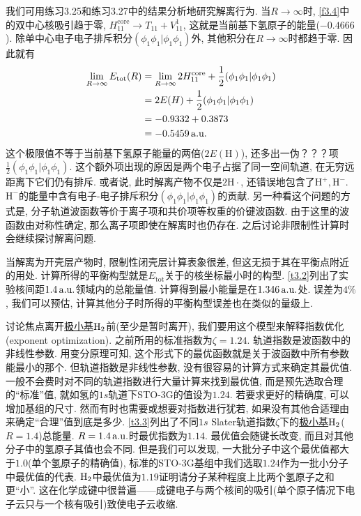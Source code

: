 我们可用练习3.25和练习3.27中的结果分析地研究解离行为. 当$R\to\infty$时, \ref{f3.4}中的双中心核吸引趋于零, $H_{11}^\mathrm{core}\to T_{11}+V_{11}^1$, 这就是当前基下氢原子的能量($-0.4666$). 除单中心电子电子排斥积分$(\phi_1\phi_1|\phi_1\phi_1)$外, 其他积分在$R\to \infty$时都趋于零. 因此就有
\begin{align*}
\lim_{R\to\infty} E_\mathrm{tot}(R) & = \lim_{R\to\infty} 2H_{11}^\mathrm{core} + \frac{1}{2}(\phi_1\phi_1|\phi_1\phi_1)\\
& = 2E(H) + \frac{1}{2}(\phi_1\phi_1|\phi_1\phi_1)\\
& = -0.9332 + 0.3873\\
& = -0.5459\,\mathrm{a.u.}
\end{align*}
这个极限值不等于当前基下氢原子能量的两倍($2E(\mathrm{H})$), 还多出一伪？？？项$\frac{1}{2}(\phi_1\phi_1|\phi_1\phi_1)$. 这个额外项出现的原因是两个电子占据了同一空间轨道, 在无穷远距离下它们仍有排斥. 或者说, 此时解离产物不仅是$2\mathrm{H}\cdot$, 还错误地包含了$\mathrm{H}^+,\mathrm{H}^-$. $\mathrm{H}^-$的能量中含有电子-电子排斥积分$(\phi_1\phi_1|\phi_1\phi_1)$的贡献. 另一种看这个问题的方式是, 分子轨道波函数等价于离子项和共价项等权重的价键波函数. 由于这里的波函数由对称性确定, 那么离子项即使在解离时也仍存在. 之后讨论非限制性\hft 计算时会继续探讨解离问题.

当解离为开壳层产物时, 限制性闭壳层\hft 计算表象很差, 但这无损于其在平衡点附近的用处. 计算所得的平衡构型就是$E_\mathrm{tot}$关于的核坐标最小时的构型. \ref{t3.2}列出了实验核间距$1.4\,\mathrm{a.u.}$领域内的总能量值. 计算得到最小能量是在$1.346\,\mathrm{a.u.}$处. 误差为$4\%$, 我们可以预估, 计算其他分子时所得的平衡构型误差也在类似的量级上. 

讨论焦点离开\underline{极小基$\mathrm{H}_2$}前(至少是暂时离开), 我们要用这个模型来解释指数优化(exponent optimization). 之前所用的标准指数为$\zeta=1.24$. 轨道指数是波函数中的非线性参数. 用变分原理可知, 这个形式下的最优函数就是关于波函数中所有参数能最小的那个. 但轨道指数是非线性参数, 没有很容易的计算方式来确定其最优值. 一般不会费时对不同的轨道指数进行大量计算来找到最优值, 而是预先选取合理的``标准''值, 就如氢的$1s$轨道下STO-3G的值设为$1.24$. 若要求更好的精确度, 可以增加基组的尺寸. 然而有时也需要或想要对指数进行犹若, 如果没有其他合适理由来确定``合理''值到底是多少. \ref{t3.3}列出了不同$1s$ Slater轨道指数$\zeta$下的\underline{极小基$\mathrm{H}_2$}($R=1.4$)总能量. $R=1.4\,\mathrm{a.u.}$时最优指数为$1.14$. 最优值会随键长改变, 而且对其他分子中的氢原子其值也会不同. 但是我们可以发现, 一大批分子中这个最优值都大于$1.0$(单个氢原子的精确值), 标准的STO-3G基组中我们选取$1.24$作为一批小分子中最优值的代表. $\mathrm{H}_2$中最优值为$1.19$证明请分子某种程度上比两个氢原子之和更``小”. 这在化学成键中很普遍——成键电子与两个核间的吸引(单个原子情况下电子云只与一个核有吸引)致使电子云收缩. 

